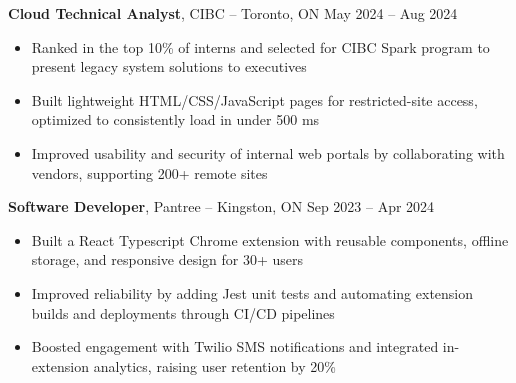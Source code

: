 \textbf{Cloud Technical Analyst}, {CIBC} -- Toronto, ON \hfill May 2024 -- Aug 2024 \\
\vspace{-5pt}
\begin{itemize}
  \item Ranked in the top 10\% of interns and selected for CIBC Spark program to present legacy system solutions to executives
  \item Built lightweight HTML/CSS/JavaScript pages for restricted-site access, optimized to consistently load in under 500 ms
  \item Improved usability and security of internal web portals by collaborating with vendors, supporting 200+ remote sites
\end{itemize}
\textbf{Software Developer}, {Pantree} -- Kingston, ON \hfill Sep 2023 -- Apr 2024 \\
\vspace{-5pt}
\begin{itemize}
  \item Built a React Typescript Chrome extension with reusable components, offline storage, and responsive design for 30+ users
  \item Improved reliability by adding Jest unit tests and automating extension builds and deployments through CI/CD pipelines
  \item Boosted engagement with Twilio SMS notifications and integrated in-extension analytics, raising user retention by 20\%
\end{itemize}
